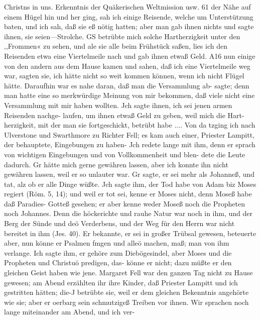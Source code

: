 Christns in uns. Erkenntnis der Quäkerischen Weltmission usw. 61
der Nähe auf einem Hügel hin und her ging, sah ich einige
Reisende, welche um Unterstützung baten, und ich sah, daß sie
eß nötig hatten; aber man gab ihnen nichts und sagte ihnen, sie
seien—Strolche. GS betrübte mich solche Hartherzigkeit unter den
,,Frommen« zu sehen, und ale sie alle beim Frühstück saßen, lies
ich den Reisenden etwa eine Viertelmeile nach und gab ihnen
etwaß Geld. A16 nun einige von den andern aus dem Hause
kamen und sahen, daß ich eine Viertelmeile weg war, sagten sie, ich
hätte nicht so weit kommen können, wenn ich nicht Flügel hätte.
Daraufhin war es nahe daran, daß man die Versammlung ab-
sagte; denn man hatte eine so merkwürdige Meinung von mir
bekommen, daß viele nicht eine Versammlung mit mir haben
wollten. Jch sagte ihnen, ich sei jenen armen Reisenden nachge-
laufen, um ihnen etwaß Geld zu geben, weil mich die Hart-
herzigkeit, mit der man sie fortgeschickt, betrübt habe ....
Von da tzging ich nach Ulverstone und Swarthmore zu
Richter Fell; es kam auch einer, Priester Lampitt, der behauptete,
Eingebungen zu haben- Jch redete lange mit ihm, denn er sprach
von wichtigen Eingebungen und von Vollkommenheit und blen-
dete die Leute dadurch. Gr hätte mich gerne gewähren lassen,
aber ich konnte ihn nicht gewähren lassen, weil er so unlauter
war. Gr sagte, er sei mehr als Johanneß, und tat, alz ob er
alle Dinge wüßte. Jch sagte ihm, der Tod habe von Adam biz
Moses regiert (Röm. 5, 14); und weil er tot sei, kenne er Moses
nicht, denn Moseß habe daß Paradies- Gotteß gesehen; er aber
kenne weder Moseß noch die Propheten noch Johannes. Denn
die höckerichte und rauhe Natur war noch in ihm, und der Berg
der Sünde und deö Verderbens, und der Weg für den Herrn
war nicht bereitet in ihm (Jes. 40). Er bekannte, er sei in großer
Trübsal gewesen, beteuerte aber, nun könne er Psalmen fmgen
und alleö machen, maß; man von ihm verlange. Ich sagte ihm,
er gehöre zum Diebögesindel, aber Moses und die Propheten
und Christuö predigen, das- könne er nicht; dazu müßte er den
gleichen Geist haben wie jene. Margaret Fell war den ganzen
Tag nicht zu Hause gewesen; am Abend erzählten ihr ihre Kinder,
daß Priester Lampitt und ich gestritten hätten; die-J betrübte sie,
weil er dem gleichen Bekenntnis angehörte wie sie; aber er
oerbarg sein schmutzigeß Treiben vor ihnen.
Wir sprachen noch lange miteinander am Abend, und ich ver-


